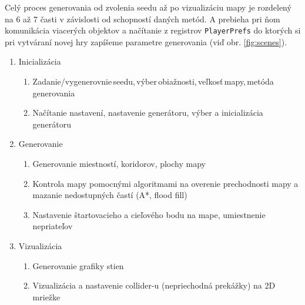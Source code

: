 Celý proces generovania od zvolenia seedu až po vizualizáciu mapy je rozdelený na 6 až 7 časti v závislosti od schopností daných metód. A prebieha pri ňom komunikácia viacerých objektov a načítanie z registrov \verb|PlayerPrefs| do ktorých si pri vytváraní novej hry zapíšeme parametre generovania (viď obr. \ref{fig:scenes}). 

\begin{enumerate}
  \item Inicializácia
  \begin{enumerate}[label*=\arabic*.]
    \item Zadanie/vygenerovnie\,seedu,\,výber\,obiažnosti,\,veľkosť\,mapy,\,metóda\,generovania
    \item Načítanie nastavení, nastavenie generátoru, výber a inicializácia generátoru
  \end{enumerate}
  
  \item Generovanie
  \begin{enumerate}[label*=\arabic*.]
    \item Generovanie miestností, koridorov, plochy mapy
    \item Kontrola mapy pomocnými algoritmami na overenie prechodnosti mapy a mazanie nedostupných častí (A*, flood fill)
    \item Nastavenie štartovacieho a cieľového bodu na mape, umiestnenie nepriateľov
  \end{enumerate}
  
  \item Vizualizácia
  \begin{enumerate}[label*=\arabic*.]
    \item Generovanie grafiky stien
    \item Vizualizácia a nastavenie collider-u (nepriechodná prekážky) na 2D mriežke
  \end{enumerate}
\end{enumerate}

